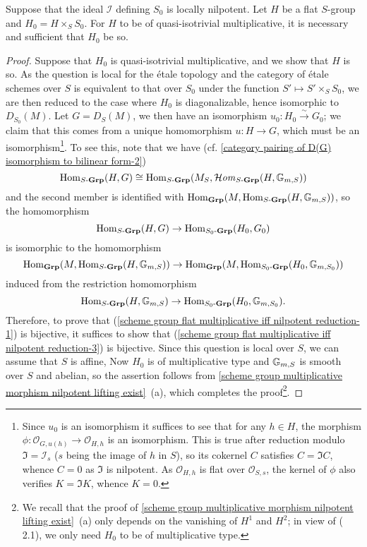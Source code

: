 \begin{corollary}\label{scheme group flat multiplicative iff nilpotent reduction}
Suppose that the ideal $\mathscr{I}$ defining $S_0$ is locally nilpotent. Let $H$ be a flat $S$-group and $H_0=H\times_SS_0$. For $H$ to be of quasi-isotrivial multiplicative, it is necessary and sufficient that $H_0$ be so.
\end{corollary}
\begin{proof}
Suppose that $H_0$ is quasi-isotrivial multiplicative, and we show that $H$ is so. As the question is local for the \'etale topology and the category of \'etale schemes over $S$ is equivalent to that over $S_0$ under the function $S'\mapsto S'\times_SS_0$, we are then reduced to the case where $H_0$ is diagonalizable, hence isomorphic to $D_{S_0}(M)$. Let $G=D_S(M)$, we then have an isomorphism $u_0:H_0\stackrel{\sim}{\to} G_0$; we claim that this comes from a unique homomorphism $u:H\to G$, which must be an isomorphism\footnote{Since $u_0$ is an isomorphism it suffices to see that for any $h\in H$, the morphism $\phi:\mathscr{O}_{G,u(h)}\to\mathscr{O}_{H,h}$ is an isomorphism. This is true after reduction modulo $\mathfrak{I}=\mathscr{I}_s$ ($s$ being the image of $h$ in $S$), so its cokernel $C$ satisfies $C=\mathfrak{I}C$, whence $C=0$ as $\mathfrak{I}$ is nilpotent. As $\mathscr{O}_{H,h}$ is flat over $\mathscr{O}_{S,s}$, the kernel of $\phi$ also verifies $K=\mathfrak{I}K$, whence $K=0$.}. To see this, note that we have (cf. \cref{category pairing of D(G) isomorphism to bilinear form-2})
\[\mathrm{Hom}_{S\textup{-}\mathbf{Grp}}(H,G)\cong\mathrm{Hom}_{S\textup{-}\mathbf{Grp}}(M_S,\operatorname{\mathcal{H}\hspace*{-0.4pt}\textit{om}\hspace{0.5pt}}_{S\textup{-}\mathbf{Grp}}(H,\mathbb{G}_{m,S}))\]
and the second member is identified with $\mathrm{Hom}_{\mathbf{Grp}}(M,\mathrm{Hom}_{S\textup{-}\mathbf{Grp}}(H,\mathbb{G}_{m,S}))$, so the homomorphism
\begin{equation}\label{scheme group flat multiplicative iff nilpotent reduction-1}
\mathrm{Hom}_{S\textup{-}\mathbf{Grp}}(H,G)\to\mathrm{Hom}_{S_0\textup{-}\mathbf{Grp}}(H_0,G_0)
\end{equation}
is isomorphic to the homomorphism
\begin{equation}\label{scheme group flat multiplicative iff nilpotent reduction-2}
\mathrm{Hom}_{\mathbf{Grp}}(M,\mathrm{Hom}_{S\textup{-}\mathbf{Grp}}(H,\mathbb{G}_{m,S}))\to\mathrm{Hom}_{\mathbf{Grp}}(M,\mathrm{Hom}_{S_0\textup{-}\mathbf{Grp}}(H_0,\mathbb{G}_{m,S_0}))
\end{equation}
induced from the restriction homomorphism
\begin{equation}\label{scheme group flat multiplicative iff nilpotent reduction-3}
\mathrm{Hom}_{S\textup{-}\mathbf{Grp}}(H,\mathbb{G}_{m,S})\to\mathrm{Hom}_{S_0\textup{-}\mathbf{Grp}}(H_0,\mathbb{G}_{m,S_0}).
\end{equation}
Therefore, to prove that (\ref{scheme group flat multiplicative iff nilpotent reduction-1}) is bijective, it suffices to show that (\ref{scheme group flat multiplicative iff nilpotent reduction-3}) is bijective. Since this question is local over $S$, we can assume that $S$ is affine, Now $H_0$ is of multiplicative type and $\mathbb{G}_{m,S}$ is smooth over $S$ and abelian, so the assertion follows from \cref{scheme group multiplicative morphism nilpotent lifting exist}~(a), which completes the proof\footnote{We recall that the proof of \cref{scheme group multiplicative morphism nilpotent lifting exist}~(a) only depends on the vanishing of $H^1$ and $H^2$; in view of (\cite{SGA3-1}  2.1), we only need $H_0$ to be of multiplicative type.}.

\end{proof}
